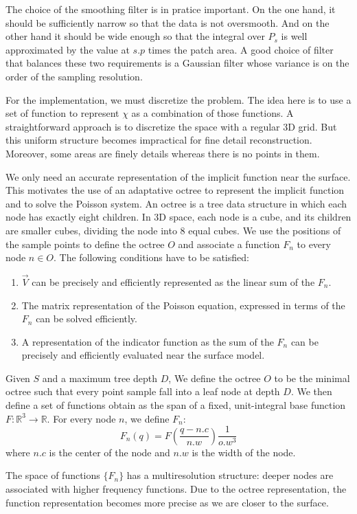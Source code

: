 \documentclass[12pt]{article}
\begin{document}
The choice of the smoothing filter is in pratice important. On the one hand, it should be sufficiently narrow so that the data is not oversmooth. And on the other hand it should be wide enough so that the integral over $P_s$ is well approximated by the value at $s.p$ times the patch area. A good choice of filter that balances these two requirements is a Gaussian filter whose variance is on the order of the sampling resolution.

For the implementation, we must discretize the problem. The idea here is to use a set of function to represent $\chi$ as a combination of those functions. A straightforward approach is to discretize the space with a regular 3D grid. But this uniform structure becomes impractical for fine detail reconstruction. Moreover, some areas are finely details whereas there is no points in them.

We only need an accurate representation of the implicit function near the surface. This motivates the use of an adaptative octree to represent the implicit function and to solve the Poisson system. An octree is a tree data structure in which each node has exactly eight children. In 3D space, each node is a cube, and its children are smaller cubes, dividing the node into 8 equal cubes. We use the positions of the sample points to define the octree $O$ and associate a function $F_n$ to every node $n \in O$. The following conditions have to be satisfied:
\begin{enumerate}
\item $\vec{V}$ can be precisely and efficiently represented as the linear sum of the $F_n$.
\item The matrix representation of the Poisson equation, expressed in terms of the $F_n$ can be solved efficiently.
\item A representation of the indicator function as the sum of the $F_n$ can be precisely and efficiently evaluated near the surface model.
\end{enumerate}

Given $S$ and a maximum tree depth $D$, We define the octree $O$ to be the minimal octree such that every point sample fall into a leaf node at depth $D$. We then define a set of functions obtain as the span of a fixed, unit-integral base function $F: \mathbb{R}^3 \to \mathbb{R}$. For every node $n$, we define $F_n$:
$$F_n(q) = F(\frac{q - n.c}{n.w})\frac{1}{o.w^3}$$
where $n.c$ is the center of the node and $n.w$ is the width of the node.

The space of functions $\{F_n\}$ has a multiresolution structure: deeper nodes are associated with higher frequency functions. Due to the octree representation, the function representation becomes more precise as we are closer to the surface.
\end{document}
